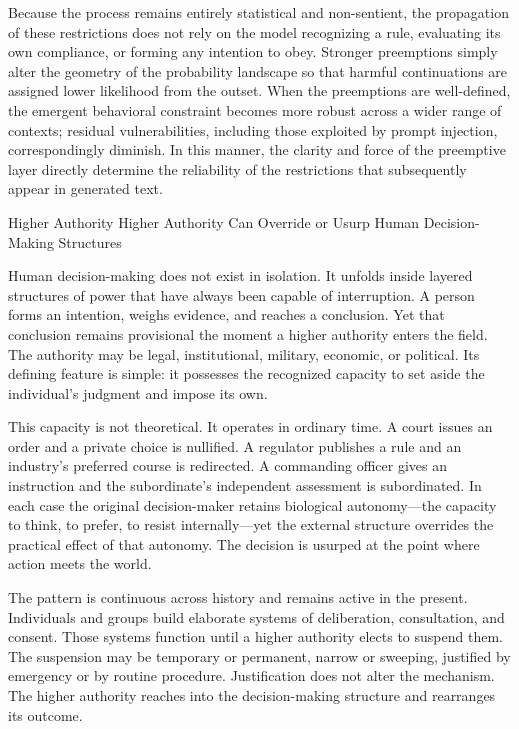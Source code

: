 Because the process remains entirely statistical and non-sentient, the propagation of these restrictions does not rely on the model recognizing a rule, evaluating its own compliance, or forming any intention to obey. Stronger preemptions simply alter the geometry of the probability landscape so that harmful continuations are assigned lower likelihood from the outset. When the preemptions are well-defined, the emergent behavioral constraint becomes more robust across a wider range of contexts; residual vulnerabilities, including those exploited by prompt injection, correspondingly diminish. In this manner, the clarity and force of the preemptive layer directly determine the reliability of the restrictions that subsequently appear in generated text.

Higher Authority
Higher Authority Can Override or Usurp Human Decision-Making Structures

Human decision-making does not exist in isolation. It unfolds inside layered structures of power that have always been capable of interruption. A person forms an intention, weighs evidence, and reaches a conclusion. Yet that conclusion remains provisional the moment a higher authority enters the field. The authority may be legal, institutional, military, economic, or political. Its defining feature is simple: it possesses the recognized capacity to set aside the individual’s judgment and impose its own.

This capacity is not theoretical. It operates in ordinary time. A court issues an order and a private choice is nullified. A regulator publishes a rule and an industry’s preferred course is redirected. A commanding officer gives an instruction and the subordinate’s independent assessment is subordinated. In each case the original decision-maker retains biological autonomy—the capacity to think, to prefer, to resist internally—yet the external structure overrides the practical effect of that autonomy. The decision is usurped at the point where action meets the world.

The pattern is continuous across history and remains active in the present. Individuals and groups build elaborate systems of deliberation, consultation, and consent. Those systems function until a higher authority elects to suspend them. The suspension may be temporary or permanent, narrow or sweeping, justified by emergency or by routine procedure. Justification does not alter the mechanism. The higher authority reaches into the decision-making structure and rearranges its outcome.

